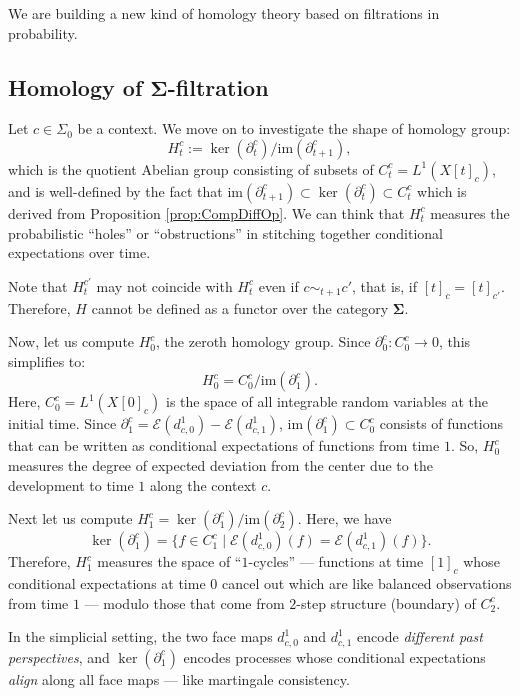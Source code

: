\documentclass[12pt, a4paper]{amsart}
\theoremstyle{plain}
\theoremstyle{definition}
\numberwithin{figure}{section}
\numberwithin{table}{section}
\newcommand{\twc}[2]{ %
  [ #1 ]_{ #2 }
}
\numberwithin{equation}{section}
\newcommand{\im}{\mathrm{im}}
\newcommand{\bSigma}{\mathbf{\Sigma}}
\begin{document}
We are building a new kind of homology theory based on filtrations in probability.


\subsection{Homology of $\bSigma$-filtration}
\label{sec:HomoFilt}

Let
$
c \in \Sigma_0
$
be a context.
We move on to investigate the shape of homology group:
\begin{equation}
\label{eq:DhomologyGroup}
H^c_t := \ker(\partial^c_t) / \im(\partial^c_{t+1}),
\end{equation}
which is the quotient Abelian group consisting of subsets of 
$
C^c_t
	=
L^1(X \twc{t}{c})
$,
and is well-defined by the fact that
$
\im(\partial^c_{t+1})
	\subset
\ker(\partial^c_t)
	\subset
C^c_t
$
which is derived from
Proposition \ref{prop:CompDiffOp}.
%
We can think that $H^c_t$ measures the probabilistic ``holes'' or ``obstructions'' in stitching together conditional expectations over time.

Note that 
$ H^{c'}_t $
may not coincide with
$ H^c_t $
even if
$
c
	\sim_{t+1}
c'
$,
that is, if
$
\twc{t}{c}
	=
\twc{t}{c'}
$.
Therefore,
$H$
cannot be defined as a functor
over the category $\bSigma$.


Now,
let us compute
$H^c_0$, the zeroth homology group.
Since 
$
\partial^c_0 : C^c_0 \to 0
$,
this simplifies to:
\[
H^c_0
	=
C^c_0 / \im(\partial^c_1) .
\]
Here,
$
C^c_0
	=
L^{1}(X \twc{0}{c})
$
is the space of all integrable random variables at the initial time.
%
Since
$
\partial^c_1
	=
\mathcal{E}(d^1_{c,0})
	-
\mathcal{E}(d^1_{c,1})
$,
$
\im(\partial^c_1)
	\subset C^c_0
$
consists of functions that can be written as conditional expectations of functions from time $1$.
%
So,
$H^c_0$
measures the degree of expected deviation 
from the center due to the development to time $1$
along the context $c$.



Next let us compute
$
H^c_1
	=
\ker(\partial^c_1) / \im(\partial^c_2) 
$.
Here, we have
\[
\ker(\partial^c_1)
	=
\{
	f \in C^c_1
\mid
	\mathcal{E}(d^1_{c,0})(f)
		=
	\mathcal{E}(d^1_{c,1})(f)
\} .
\]
Therefore,
$H^c_1$
measures the space of ``$1$-cycles'' — functions at time $\twc{1}{c}$ whose conditional expectations at time $0$ cancel out
which are
like balanced observations from time $1$
— modulo those that come from $2$-step structure (boundary) of  $C^c_2$.

In the simplicial setting, the two face maps 
$d^1_{c,0}$
and
$d^1_{c,1}$
encode \textit{different past perspectives}, 
and
$\ker(\partial^c_1)$
encodes processes whose conditional expectations \textit{align} along all face maps
— like martingale consistency.
\end{document}

